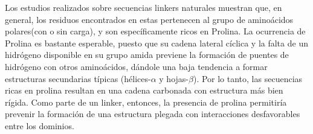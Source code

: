 

Los estudios realizados sobre secuencias linkers naturales \cite{argos1990investigation, george2002analysis, chen2013fusion} muestran que, en general, 
los residuos encontrados en estas pertenecen al grupo de aminoácidos polares(con o sin carga), y son específicamente ricos en Prolina. %
La ocurrencia de Prolina es bastante esperable, puesto que su cadena lateral cíclica y la falta de un hidrógeno disponible 
en su grupo amida previene la formación de puentes de hidrógeno con otros aminoácidos, dándole una baja 
tendencia a formar estructuras secundarias típicas (hélices-$\alpha$ y hojas-$\beta$). Por lo tanto, las secuencias ricas en prolina resultan en una cadena carbonada con estructura 
más bien rígida. Como parte de un linker, entonces, la presencia de prolina permitiría prevenir la formación de una estructura plegada con interacciones desfavorables entre los dominios. 





